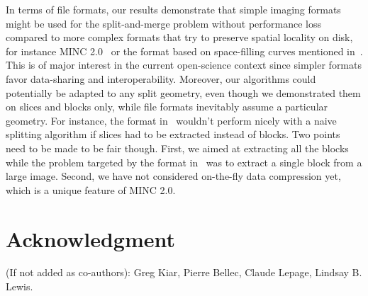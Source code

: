 \documentclass[10pt, conference, compsocconf]{IEEEtran}
\begin{document}
In terms of file formats, our results demonstrate that simple imaging
formats might be used for the split-and-merge problem without
performance loss compared to more complex formats that try to preserve
spatial locality on disk, for instance MINC 2.0~\cite{vincent2016minc}
or the format based on space-filling curves mentioned
in~\cite{burns2013open}. This is of major interest in the current
open-science context since simpler formats favor data-sharing and
interoperability.  Moreover, our algorithms could potentially be
adapted to any split geometry, even though we demonstrated them on
slices and blocks only, while file formats inevitably assume a
particular geometry. For instance, the format in~\cite{burns2013open}
wouldn't perform nicely with a naive splitting algorithm if slices had
to be extracted instead of blocks.  Two points need to be made to be
fair though. First, we aimed at extracting all the blocks while the
problem targeted by the format in~\cite{burns2013open} was to extract
a single block from a large image. Second, we have not considered
on-the-fly data compression yet, which is a unique feature of MINC
2.0.



\section*{Acknowledgment}

(If not added as co-authors): Greg Kiar, Pierre Bellec, Claude Lepage, Lindsay B. Lewis.



\end{document}
